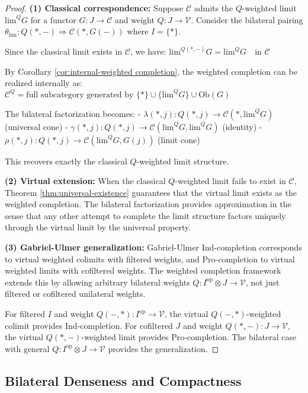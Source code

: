 \documentclass[11pt]{article}
\theoremstyle{plain}
\theoremstyle{definition}
\theoremstyle{remark}
\newcommand{\V}{\mathcal{V}}
\newcommand{\C}{\mathcal{C}}
\newcommand{\op}{\mathrm{op}}
\renewcommand{\lim}{\mathrm{lim}}
\begin{document}
\begin{proof}
\textbf{(1) Classical correspondence:} 
Suppose $\C$ admits the $Q$-weighted limit $\lim^Q G$ for a functor $G : J \to \C$ and weight $Q : J \to \V$. Consider the bilateral pairing $\theta_{\lim} : Q(\ast, -) \Rightarrow \C(\ast, G(-))$ where $I = \{\ast\}$.

Since the classical limit exists in $\C$, we have:
$\lim^{Q(\ast, -)} G = \lim^Q G \quad \text{in } \C$

By Corollary \ref{cor:internal-weighted completion}, the weighted completion can be realized internally as:
$\C^Q = \text{full subcategory generated by } \{\ast\} \cup \{\lim^Q G\} \cup \mathrm{Ob}(G)$

The bilateral factorization becomes:
- $\lambda(\ast, j) : Q(\ast, j) \to \C(\ast, \lim^Q G)$ (universal cone)
- $\gamma(\ast, j) : Q(\ast, j) \to \C(\lim^Q G, \lim^Q G)$ (identity)
- $\rho(\ast, j) : Q(\ast, j) \to \C(\lim^Q G, G(j))$ (limit cone)

This recovers exactly the classical $Q$-weighted limit structure.

\textbf{(2) Virtual extension:}
When the classical $Q$-weighted limit fails to exist in $\C$, Theorem \ref{thm:universal-existence} guarantees that the virtual limit exists as the weighted completion. The bilateral factorization provides approximation in the sense that any other attempt to complete the limit structure factors uniquely through the virtual limit by the universal property.

\textbf{(3) Gabriel-Ulmer generalization:}
Gabriel-Ulmer Ind-completion corresponds to virtual weighted colimits with filtered weights, and Pro-completion to virtual weighted limits with cofiltered weights. The weighted completion framework extends this by allowing arbitrary bilateral weights $Q : I^{\op} \otimes J \to \V$, not just filtered or cofiltered unilateral weights.

For filtered $I$ and weight $Q(-, \ast) : I^{\op} \to \V$, the virtual $Q(-, \ast)$-weighted colimit provides Ind-completion. For cofiltered $J$ and weight $Q(\ast, -) : J \to \V$, the virtual $Q(\ast, -)$-weighted limit provides Pro-completion. The bilateral case with general $Q : I^{\op} \otimes J \to \V$ provides the generalization.
\end{proof}

\subsection{Bilateral Denseness and Compactness}
\end{document}
